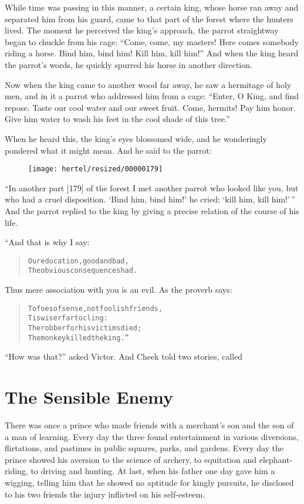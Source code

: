 \documentclass[article, twoside, 10pt]{memoir}
\renewenvironment{verbatim}{%
\begin{quote}%
\vskip -10pt%
\begin{alltt}\normalfont\small}{\end{alltt}%
\end{quote}%
\vskip -10pt
} %
\begin{document}
While time was passing in this manner, a certain king, whose horse
ran away and separated him from his guard, came to that part of the
forest where the hunters lived. The moment he perceived the king's
approach, the parrot straightway began to chuckle from his cage:
``Come, come, my masters! Here comes somebody riding a horse. Bind him, bind him! Kill him, kill him!''
And when the king heard the parrot's words, he quickly spurred his
horse in another direction.

Now when the king came to another wood far away, he saw a hermitage
of holy men, and in it a parrot who addressed him from a cage:
``Enter, O King, and find repose. Taste our cool water and our sweet fruit. Come, hermits! Pay him honor. Give him water to wash his feet in the cool shade of this tree.''

When he heard this, the king's eyes blossomed wide, and he
wonderingly pondered what it might mean. And he said to the parrot:
\begin{figure}[p]\texttt{[image: hertel/resized/00000179]}\end{figure}``In another part [179] of the forest I met another parrot who looked like you, but who had a cruel disposition. `Bind him, bind him!' he cried; `kill him, kill him!'\,''
And the parrot replied to the king by giving a precise relation of
the course of his life.

“And that is why I say:

\begin{verbatim}
Our education, good and bad,
The obvious consequences had.
\end{verbatim}
Thus mere association with you is an evil. As the proverb says:

\begin{verbatim}
To foes of sense, not foolish friends,
    Tis wiser far to cling:
The robber for his victims died;
    The monkey killed the king.”
\end{verbatim}
``How was that?'' asked Victor. And Cheek told two stories, called

\chapter{The Sensible Enemy}

There was once a prince who made friends with a merchant's son and
the son of a man of learning. Every day the three found
entertainment in various diversions, flirtations, and pastimes in
public squares, parks, and gardens. Every day the prince showed his
aversion to the science of archery, to equitation and
elephant-riding, to driving and hunting. At last, when his father
one day gave him a wigging, telling him that he showed no aptitude
for kingly pursuits, he disclosed to his two friends the injury
inflicted on his self-esteem.
\end{document}

